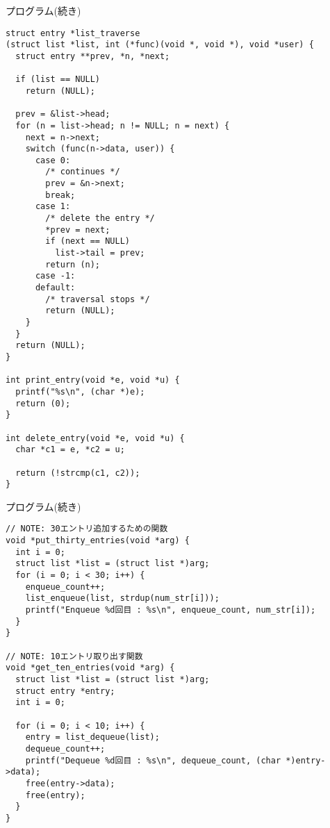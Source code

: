 \documentclass[10pt]{jarticle}
\begin{document}
\begin{itembox}[l]{プログラム(続き)}
  \begin{verbatim}
struct entry *list_traverse
(struct list *list, int (*func)(void *, void *), void *user) {
  struct entry **prev, *n, *next;

  if (list == NULL)
    return (NULL);

  prev = &list->head;
  for (n = list->head; n != NULL; n = next) {
    next = n->next;
    switch (func(n->data, user)) {
      case 0:
        /* continues */
        prev = &n->next;
        break;
      case 1:
        /* delete the entry */
        *prev = next;
        if (next == NULL)
          list->tail = prev;
        return (n);
      case -1:
      default:
        /* traversal stops */
        return (NULL);
    }
  }
  return (NULL);
}

int print_entry(void *e, void *u) {
  printf("%s\n", (char *)e);
  return (0);
}

int delete_entry(void *e, void *u) {
  char *c1 = e, *c2 = u;

  return (!strcmp(c1, c2));
}
  \end{verbatim}
\end{itembox}

\begin{itembox}[l]{プログラム(続き)}
  \begin{verbatim}
// NOTE: 30エントリ追加するための関数
void *put_thirty_entries(void *arg) {
  int i = 0;
  struct list *list = (struct list *)arg;
  for (i = 0; i < 30; i++) {
    enqueue_count++;
    list_enqueue(list, strdup(num_str[i]));
    printf("Enqueue %d回目 : %s\n", enqueue_count, num_str[i]);
  }
}

// NOTE: 10エントリ取り出す関数
void *get_ten_entries(void *arg) {
  struct list *list = (struct list *)arg;
  struct entry *entry;
  int i = 0;

  for (i = 0; i < 10; i++) {
    entry = list_dequeue(list);
    dequeue_count++;
    printf("Dequeue %d回目 : %s\n", dequeue_count, (char *)entry->data);
    free(entry->data);
    free(entry);
  }
}
  \end{verbatim}
\end{itembox}
\end{document}
